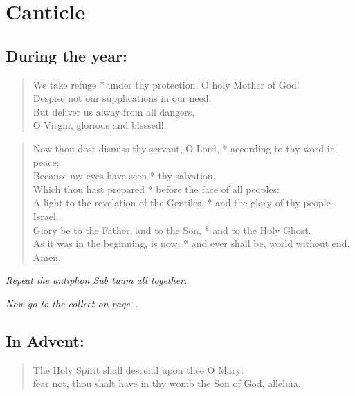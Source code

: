\documentclass[12pt,a5paper]{memoir}
\newcommand{\rubrics}[1]{\noindent\textit{#1}}
\begin{document}
\section*{Canticle}

\subsection*{During the year:}


\begin{verse}
We take refuge * under thy protection, O holy Mother of God!\\
Despise not our supplications in our need,\\
But deliver us alway from all dangers, \\
O Virgin, glorious and blessed!
\end{verse}



\begin{verse}
Now thou dost dismiss thy servant, O Lord, * according to thy word in peace;\\
Because my eyes have seen * thy salvation,\\
Which thou hast prepared * before the face of all peoples:\\
A light to the revelation of the Gentiles, * and the glory of thy people Israel.\\
Glory be to the Father, and to the Son, * and to the Holy Ghost.\\
As it was in the beginning, is now, * and ever shall be, world without end. Amen.
\end{verse}

\rubrics{Repeat the antiphon \emph{Sub tuum} all together.}

\rubrics{Now go to the collect on page~\pageref{collect}.}

\subsection*{In Advent:}


\begin{verse}
The Holy Spirit shall descend upon thee O Mary:\\
fear not, thou shalt have in thy womb the Son of God, alleluia.
\end{verse}
\end{document}

